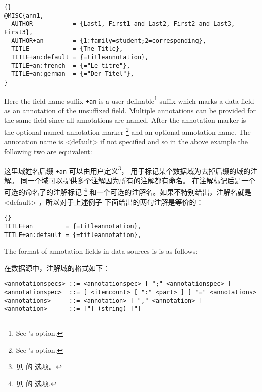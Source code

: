 \begin{lstlisting}[style=bibtex]{}
@MISC{ann1,
  AUTHOR           = {Last1, First1 and Last2, First2 and Last3, First3},
  AUTHOR+an        = {1:family=student;2=corresponding},
  TITLE            = {The Title},
  TITLE+an:default = {=titleannotation},
  TITLE+an:french  = {="Le titre"},
  TITLE+an:german  = {="Der Titel"},
}
\end{lstlisting}
%
Here the field name suffix \texttt{+an} is a user-definable\footnote{See \biber's  option.} suffix which marks a data field as an annotation of the unsuffixed field. Multiple annotations can be provided for the same field since all annotations are named. After the annotation marker is the optional named annotation marker \footnote{See \biber's  option.} and an optional annotation name. The annotation name is <default> if not specified and so in the above example the following two are equivalent:



这里域姓名后缀 \texttt{+an} 可以由用户定义\footnote{
	见 \biber 的  选项。}，
用于标记某个数据域为去掉后缀的域的注解。
同一个域可以提供多个注解因为所有的注解都有命名。
在注解标记后是一个可选的命名了的注解标记
 \footnote{见 \biber 的  选项.}
 和一个可选的注解名。如果不特别给出，注解名就是<default> ，所以对于上述例子
 下面给出的两句注解是等价的：

\begin{lstlisting}[style=bibtex]{}
TITLE+an         = {=titleannotation},
TITLE+an:default = {=titleannotation},
\end{lstlisting}
%
The format of annotation fields in \bibtex data sources is is as follows:


在\bibtex 数据源中，注解域的格式如下：

\begin{lstlisting}
<annotationspecs> ::= <annotationspec> [ ";" <annotationspec> ]
<annotationspec>  ::= [ <itemcount> [ ":" <part> ] ] "=" <annotations>
<annotations>     ::= <annotation> [ "," <annotation> ]
<annotation>      ::= ["] (string) ["]
\end{lstlisting}
%


